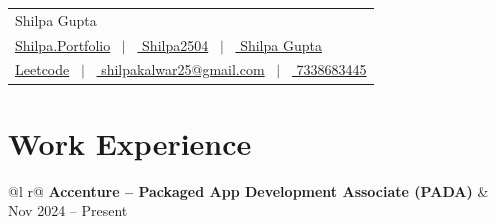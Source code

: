 \documentclass[a4paper,11pt]{article}
\begin{document}
\pagestyle{empty}

\noindent\begin{tabularx}{\linewidth}{@{} X @{}}
\Huge{Shilpa Gupta} \\[7.5pt]
\href{https://myportfolio-d378f.firebaseapp.com/}{\raisebox{-0.05\height}{\faLink} Shilpa.Portfolio} \ $|$ \
\href{https://github.com/Shilpa2504}{\raisebox{-0.05\height}{\faGithub} Shilpa2504} \ $|$ \
\href{https://www.linkedin.com/in/shilpa-gupta-621a90259/}{\raisebox{-0.05\height}{\faLinkedin} Shilpa Gupta} \\
\href{https://leetcode.com/Shilpa_gupta/}{\raisebox{-0.05\height} Leetcode} \ $|$ \
\href{mailto:shilpakalwar25@gmail.com}{\raisebox{-0.05\height} shilpakalwar25@gmail.com} \ $|$ \
\href{tel:7338683445}{\raisebox{-0.05\height} 7338683445}
\end{tabularx}

\section{Work Experience}

\begin{tabularx}{\linewidth}{@{}l r@{}}
\textbf{Accenture -- Packaged App Development Associate (PADA)} & Nov 2024 -- Present \\[2pt]
 \\
 \\
 \\
 \\
\end{tabularx}
\end{document}
